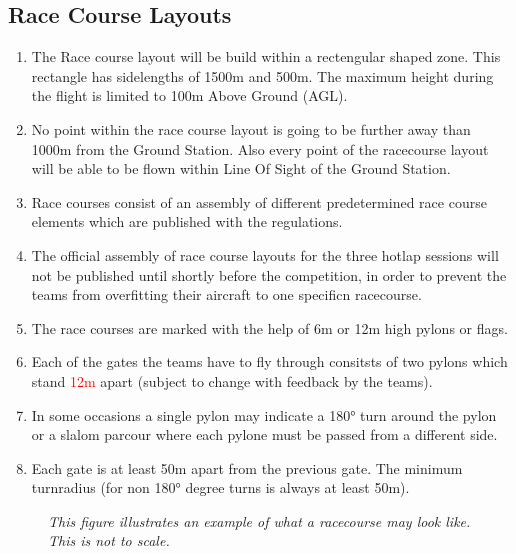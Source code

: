     \subsection{Race Course Layouts}
    \begin{enumerate}
      \item The Race course layout will be build within a rectengular shaped zone. This rectangle has sidelengths of 1500m and 500m. The maximum height during the flight is limited to 100m Above Ground (AGL).
      \item No point within the race course layout is going to be further away than 1000m from the Ground Station. Also every point of the racecourse layout will be able to be flown within Line Of Sight of the Ground Station. 
      \item Race courses consist of an assembly of different predetermined race course elements which are published with the regulations.
      \item The official assembly of race course layouts for the three hotlap sessions will not be published until shortly before the competition, in order to prevent the teams from overfitting their aircraft to one specificn racecourse. 
      \item The race courses are marked with the help of 6m or 12m high pylons or flags.
      \item Each of the gates the teams have to fly through consitsts of two pylons which stand \textcolor{red}{12m} apart (subject to change with feedback by the teams).
      \item In some occasions a single pylon may indicate a 180° turn around the pylon or a slalom parcour where each pylone must be passed from a different side. 
      \item Each gate is at least 50m apart from the previous gate. The minimum turnradius (for non 180° degree turns is always at least 50m).
    \end{enumerate}

    \begin{figure}[h!]
      \centering
     \caption{\textit{This figure illustrates an example of what a racecourse may look like. This is not to scale.}}
     \end{figure}


